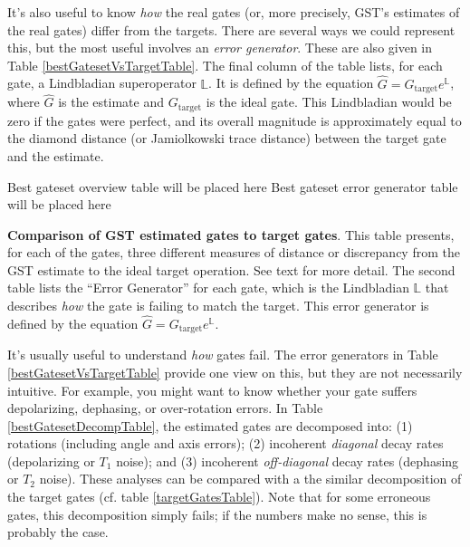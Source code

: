 \documentclass{article}[11pt]
\newcommand{\putfield}[2]{#2}
\begin{document}
It's also useful to know \emph{how} the real gates (or, more precisely, GST's estimates of the real gates) differ from the targets.  There are several ways we could represent this, but the most useful involves an \emph{error generator}.  These are also given in Table \ref{bestGatesetVsTargetTable}.  The final column of the table lists, for each gate, a Lindbladian superoperator $\mathbb{L}$.  It is defined by the equation $\hat{G} = G_{\mathrm{target}}e^{\mathbb{L}}$, where $\hat{G}$ is the estimate and $G_{\mathrm{target}}$ is the ideal gate.  This Lindbladian would be zero if the gates were perfect, and its overall magnitude is approximately equal to the diamond distance (or Jamiolkowski trace distance) between the target gate and the estimate.

\begin{table}[h]
\begin{center}
\putfield{bestGatesetVsTargetTable}{Best gateset overview table will be placed here}
\vspace{2em}
\putfield{bestGatesetErrorGenTable}{Best gateset error generator table will be placed here}
\caption{\textbf{Comparison of GST estimated gates to target gates}.  This table presents, for each of the gates, three different measures of distance or discrepancy from the GST estimate to the ideal target operation.  See text for more detail.  The second table lists the ``Error Generator'' for each gate, which is the Lindbladian $\mathbb{L}$ that describes \emph{how} the gate is failing to match the target.  This error generator is defined by the equation $\hat{G} = G_{\mathrm{target}}e^{\mathbb{L}}$. \label{bestGatesetVsTargetTable}}
\end{center}
\end{table}

It's usually useful to understand \emph{how} gates fail.  The error generators in Table \ref{bestGatesetVsTargetTable} provide one view on this, but they are not necessarily intuitive.   For example, you might want to know whether your gate suffers depolarizing, dephasing, or over-rotation errors.  In Table \ref{bestGatesetDecompTable}, the estimated gates are decomposed into: (1) rotations (including angle and axis errors); (2) incoherent \emph{diagonal} decay rates (depolarizing or $T_1$ noise); and (3) incoherent \emph{off-diagonal} decay rates (dephasing or $T_2$ noise).  These analyses can be compared with a the similar decomposition of the target gates (cf. table \ref{targetGatesTable}).  Note that for some erroneous gates, this decomposition simply fails; if the numbers make no sense, this is probably the case.
\end{document}
